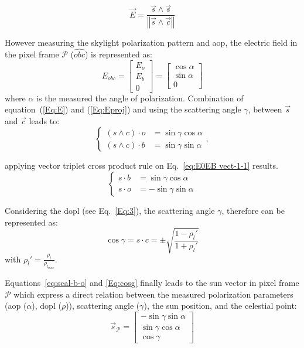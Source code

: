 \begin{equation}
\vec{E}=\frac{\vec{s}\wedge \vec{s}}{\left\Vert \vec{s}\wedge
    \vec{c}\right\Vert }
\label{Eq:E}
\end{equation}

However measuring the skylight polarization pattern and \gls{aop}, the electric
field in the pixel frame $\mathcal{P}$ ($\widehat{obc}$) is represented as:
\begin{equation}
E_{obc}=\left[\begin{array}{l}
E_{o}\\
E_{b}\\
0
\end{array}\right]=\left[\begin{array}{l}
\cos\alpha\\
\sin\alpha\\
0
\end{array}\right]
\label{Eq:Eproj}
\end{equation}
\noindent where $\alpha$ is the measured the angle of polarization.
Combination of equation~(\ref{Eq:E}) and (\ref{Eq:Eproj}) and using the
scattering angle $\gamma$, between $\vec{s}$ and $\vec{c}$ leads to:
\begin{equation}
\begin{cases}
(s\wedge c)\cdot o & =\sin\gamma\cos\alpha\\
(s\wedge c)\cdot b & =\sin\gamma\sin\alpha
\end{cases},\label{eq:E0EB vect-1-1}
\end{equation}

\noindent applying vector triplet cross product rule on Eq.~\ref{eq:E0EB
  vect-1-1} results.
\begin{equation}
\begin{cases}
s\cdot b & =\sin\gamma\cos\alpha\\
s\cdot o & =-\sin\gamma\sin\alpha
\end{cases}\label{eq:scal-b-o}
\end{equation}

Considering the \gls{dopl} (see Eq.~\ref{Eq:3}), the scattering angle
$\gamma$, therefore can be represented as:
\begin{equation}
\cos\gamma=s\cdot c=\pm\sqrt{\frac{1-\rho_{l}'}{1+\rho_{l}'}}
\label{Eq:cosg}
\end{equation}
\noindent with $\rho_{l}'=\frac{\rho_{l}}{\rho_{l_{max}}}.$

Equations~\ref{eq:scal-b-o} and \ref{Eq:cosg} finally leads to the sun vector
in pixel frame $\mathcal{P}$ which express a direct relation between the
measured polarization parameters (\gls{aop} ($\alpha$), \gls{dopl} ($\rho$)),
scattering angle ($\gamma$), the sun position,  and the celestial point:
\begin{equation}
  \label{Eq:sunp}
  \vec{s}_{\mathcal{P}} =
  \left[
    \begin{array}{l}
    -\sin\gamma \sin\alpha\\
    \sin\gamma \cos\alpha\\
    \cos\gamma
  \end{array}
  \right]
\end{equation}


